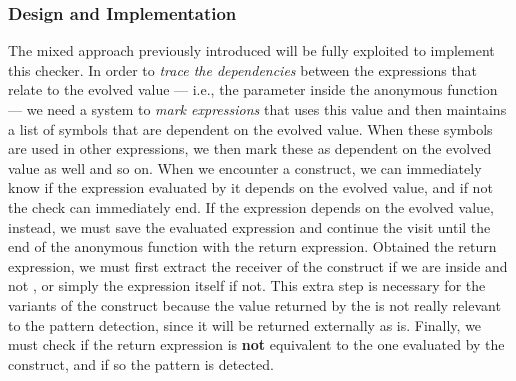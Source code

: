 \documentclass[12pt,a4paper,openright,twoside]{book}
\begin{document}
\subsubsection{Design and Implementation}

The mixed approach previously introduced will be fully exploited to implement
this checker. In order to \emph{trace the dependencies} between the expressions
that relate to the evolved value --- i.e., the parameter inside the
 anonymous function --- we need a system to \emph{mark expressions}
that uses this value and then maintains a list of symbols that are dependent on
the evolved value. 
%
When these symbols are used in other expressions, we then mark these as
dependent on the evolved value as well and so on. When we encounter a
 construct, we can immediately know if the expression
evaluated by it depends on the evolved value, and if not the check can
immediately end.
%
If the expression depends on the evolved value, instead, we must save the
evaluated expression and continue the visit until the end of the anonymous
function with the return expression. Obtained the return expression, we must
first extract the receiver of the  construct if we are inside
 and not , or simply the expression itself if not. 
%
This extra step is necessary for the variants of the construct because the 
value returned by the  is not really relevant to the pattern
detection, since it will be returned externally as is.
%
Finally, we must check if the return expression is \textbf{not} equivalent to
the one evaluated by the  construct, and if so the pattern is
detected. 
\end{document}
